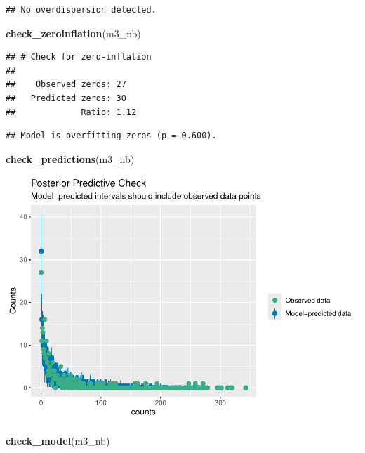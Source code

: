 \documentclass[
]{article}
\newenvironment{Shaded}{\begin{snugshade}}{\end{snugshade}}
\newcommand{\FunctionTok}[1]{\textcolor[rgb]{0.13,0.29,0.53}{\textbf{#1}}}
\newcommand{\NormalTok}[1]{#1}
\begin{document}
\begin{verbatim}
## No overdispersion detected.
\end{verbatim}

\begin{Shaded}
\begin{Highlighting}[]
\FunctionTok{check\_zeroinflation}\NormalTok{(m3\_nb)}
\end{Highlighting}
\end{Shaded}

\begin{verbatim}
## # Check for zero-inflation
## 
##    Observed zeros: 27
##   Predicted zeros: 30
##             Ratio: 1.12
\end{verbatim}

\begin{verbatim}
## Model is overfitting zeros (p = 0.600).
\end{verbatim}

\begin{Shaded}
\begin{Highlighting}[]
\FunctionTok{check\_predictions}\NormalTok{(m3\_nb)}
\end{Highlighting}
\end{Shaded}

\includegraphics{hw1-lobstrs-eds241_files/figure-latex/unnamed-chunk-27-1.pdf}

\begin{Shaded}
\begin{Highlighting}[]
\FunctionTok{check\_model}\NormalTok{(m3\_nb)}
\end{Highlighting}
\end{Shaded}
\end{document}
